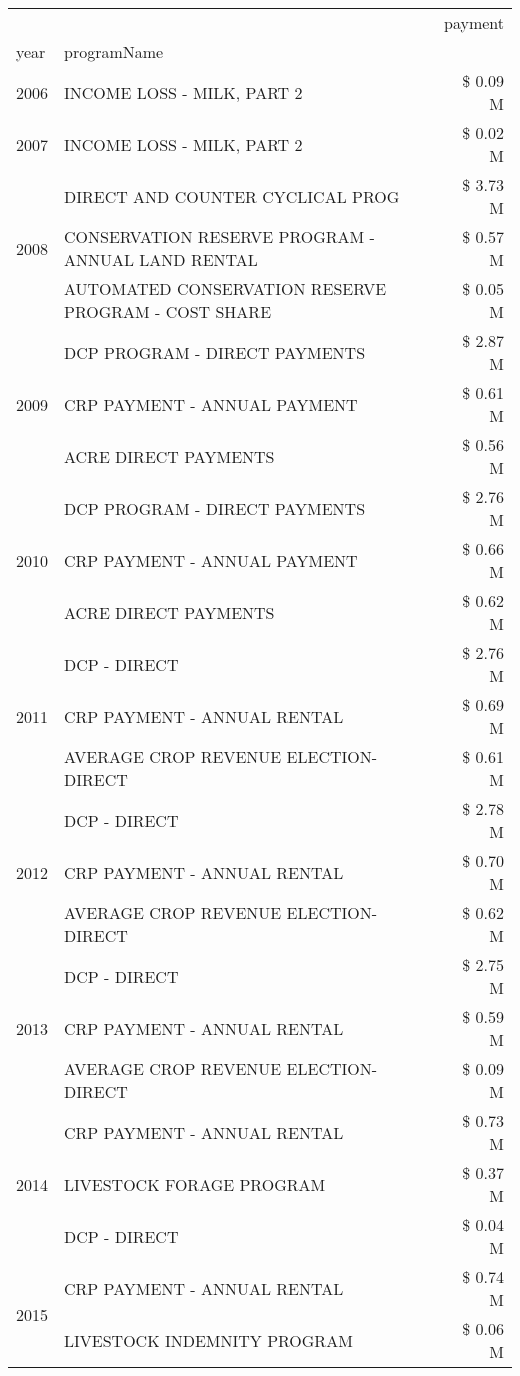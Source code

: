 \begin{tabular}{llr}
\toprule
 &  & payment \\
year & programName &  \\
\midrule
2006 & INCOME LOSS - MILK, PART 2 & \$ 0.09 M \\
\cline{1-3}
2007 & INCOME LOSS - MILK, PART 2 & \$ 0.02 M \\
\cline{1-3}
\multirow[t]{3}{*}{2008} & DIRECT AND COUNTER CYCLICAL PROG & \$ 3.73 M \\
 & CONSERVATION RESERVE PROGRAM - ANNUAL LAND RENTAL & \$ 0.57 M \\
 & AUTOMATED CONSERVATION RESERVE PROGRAM - COST SHARE & \$ 0.05 M \\
\cline{1-3}
\multirow[t]{3}{*}{2009} & DCP PROGRAM - DIRECT PAYMENTS & \$ 2.87 M \\
 & CRP PAYMENT - ANNUAL PAYMENT & \$ 0.61 M \\
 & ACRE DIRECT PAYMENTS & \$ 0.56 M \\
\cline{1-3}
\multirow[t]{3}{*}{2010} & DCP PROGRAM - DIRECT PAYMENTS & \$ 2.76 M \\
 & CRP PAYMENT - ANNUAL PAYMENT & \$ 0.66 M \\
 & ACRE DIRECT PAYMENTS & \$ 0.62 M \\
\cline{1-3}
\multirow[t]{3}{*}{2011} & DCP - DIRECT & \$ 2.76 M \\
 & CRP PAYMENT - ANNUAL RENTAL & \$ 0.69 M \\
 & AVERAGE CROP REVENUE ELECTION-DIRECT & \$ 0.61 M \\
\cline{1-3}
\multirow[t]{3}{*}{2012} & DCP - DIRECT & \$ 2.78 M \\
 & CRP PAYMENT - ANNUAL RENTAL & \$ 0.70 M \\
 & AVERAGE CROP REVENUE ELECTION-DIRECT & \$ 0.62 M \\
\cline{1-3}
\multirow[t]{3}{*}{2013} & DCP - DIRECT & \$ 2.75 M \\
 & CRP PAYMENT - ANNUAL RENTAL & \$ 0.59 M \\
 & AVERAGE CROP REVENUE ELECTION-DIRECT & \$ 0.09 M \\
\cline{1-3}
\multirow[t]{3}{*}{2014} & CRP PAYMENT - ANNUAL RENTAL & \$ 0.73 M \\
 & LIVESTOCK FORAGE PROGRAM & \$ 0.37 M \\
 & DCP - DIRECT & \$ 0.04 M \\
\cline{1-3}
\multirow[t]{3}{*}{2015} & CRP PAYMENT - ANNUAL RENTAL & \$ 0.74 M \\
 & LIVESTOCK INDEMNITY PROGRAM & \$ 0.06 M \\

\end{tabular}
